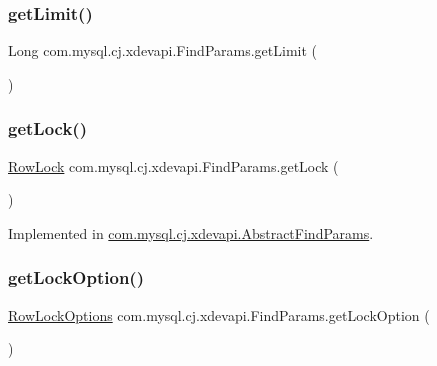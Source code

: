 \subsubsection{\texorpdfstring{get\+Limit()}{getLimit()}}
{\footnotesize\ttfamily Long com.\+mysql.\+cj.\+xdevapi.\+Find\+Params.\+get\+Limit (\begin{DoxyParamCaption}{ }\end{DoxyParamCaption})}

\mbox{\label{interfacecom_1_1mysql_1_1cj_1_1xdevapi_1_1_find_params_a4b415ce43977c05c58ed209b5d200c27}} 
\subsubsection{\texorpdfstring{get\+Lock()}{getLock()}}
{\footnotesize\ttfamily \mbox{\hyperlink{enumcom_1_1mysql_1_1cj_1_1xdevapi_1_1_find_params_1_1_row_lock}{Row\+Lock}} com.\+mysql.\+cj.\+xdevapi.\+Find\+Params.\+get\+Lock (\begin{DoxyParamCaption}{ }\end{DoxyParamCaption})}



Implemented in \mbox{\hyperlink{classcom_1_1mysql_1_1cj_1_1xdevapi_1_1_abstract_find_params_ab7fd8c9c27d43e696a0c0bdfc207efba}{com.\+mysql.\+cj.\+xdevapi.\+Abstract\+Find\+Params}}.

\mbox{\label{interfacecom_1_1mysql_1_1cj_1_1xdevapi_1_1_find_params_a8e6ab7c549b8fd7427416bf908c7ab2e}} 
\subsubsection{\texorpdfstring{get\+Lock\+Option()}{getLockOption()}}
{\footnotesize\ttfamily \mbox{\hyperlink{enumcom_1_1mysql_1_1cj_1_1xdevapi_1_1_find_params_1_1_row_lock_options}{Row\+Lock\+Options}} com.\+mysql.\+cj.\+xdevapi.\+Find\+Params.\+get\+Lock\+Option (\begin{DoxyParamCaption}{ }\end{DoxyParamCaption})}



